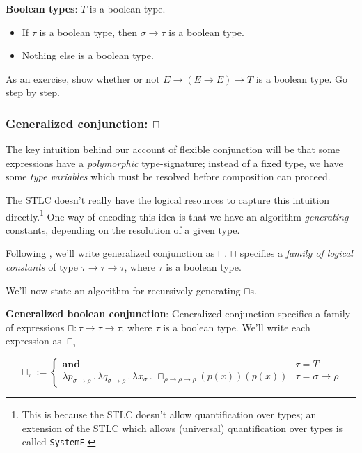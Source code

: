 \documentclass[letterpaper,parskip=half]{scrartcl}
\begin{document}
\begin{definition}
\textbf{Boolean types}: \(T\) is a boolean type.
\begin{itemize}
\item If \(\tau\) is a boolean type, then \(\sigma \to \tau\) is a boolean type.
\item Nothing else is a boolean type.
\end{itemize}
\end{definition}

As an exercise, show whether or not \(E \to (E \to E) \to T\) is a boolean type. Go step by step.

\subsubsection{Generalized conjunction: \(\sqcap\)}
\label{sec:org9ff81c1}

The key intuition behind our account of flexible conjunction will be that some expressions have a \emph{polymorphic} type-signature; instead of a fixed type, we have some \emph{type variables} which must be resolved before composition can proceed.

The STLC doesn't really have the logical resources to capture this intuition directly.\footnote{This is because the STLC doesn't allow quantification over types; an extension of the STLC which allows (universal) quantification over types is called \texttt{SystemF}.} One way of encoding this idea is that we have an algorithm \emph{generating} constants, depending on the resolution of a given type.

Following \autocite{Winter2001}, we'll write generalized conjunction as \(\sqcap\). \(\sqcap\) specifies a \emph{family of logical constants} of type \(\tau \to \tau \to \tau\), where \(\tau\) is a boolean type.

We'll now state an algorithm for recursively generating \(\sqcap\)s.

\begin{definition}
\textbf{Generalized boolean conjunction}: Generalized conjunction specifies a family of expressions \(\sqcap: {\tau \to \tau \to \tau }\), where \(\tau\) is a boolean type. We'll write each expression as \(\sqcap_\tau\)

\[\sqcap_{\tau} := \begin{cases}
\mathbf{and}&\tau = T\\
\lambda p_{\sigma \to \rho}\,.\,\lambda q_{\sigma \to \rho}\,.\,\lambda x_{\sigma }\,.\,\,\sqcap_{\rho \to \rho \to \rho}(p(x))(p(x))&\tau = \sigma \to \rho
\end{cases}\]
\end{definition}
\end{document}
